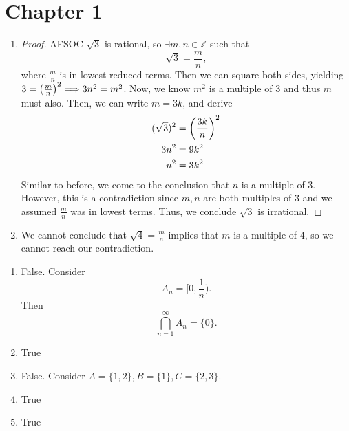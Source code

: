 \section*{Chapter 1}

\setcounter{section}{1}

\setcounter{subsection}{2}
\begin{exercise}
\begin{enumerate}[label=(\alph*)]
	\item 
	\begin{proof}
		AFSOC $\sqrt{3}$ is rational, so $\exists m, n \in \mathbb{Z}$ such that 
		\begin{equation}
			\sqrt{3} = \frac{m}{n},
		\end{equation}
		where $\frac{m}{n}$ is in lowest reduced terms.
		Then we can square both sides, yielding $3 = \left(\frac{m}{n}\right)^2 \Longrightarrow 3n^2 = m^2$. Now, we know $m^2$ is a multiple of 3 and thus $m$ must also. Then, we can write $m = 3k$, and derive
		\begin{align*}
		(\sqrt{3})^2 &= \left(\frac{3k}{n}\right)^2 \\
		3n^2 &= 9k^2 \\
		n^2 &= 3k^2
		\end{align*}
		Similar to before, we come to the conclusion that $n$ is a multiple of 3. However, this is a contradiction since $m, n$ are both multiples of 3 and we assumed $\frac{m}{n}$ was in lowest terms. Thus, we conclude $\sqrt{3}$ is irrational.
	\end{proof}
	\item We cannot conclude that $\sqrt{4} = \frac{m}{n}$ implies that $m$ is a multiple of $4$, so we cannot reach our contradiction.
\end{enumerate}
\end{exercise}

\begin{exercise}
	\begin{enumerate}[label=(\alph*)]
		\item False. Consider 
		\begin{equation}
			A_n = [0, \frac{1}{n}).
		\end{equation}
		Then 
		\begin{equation}
			\bigcap_{n=1}^\infty A_n = \{0\}.
		\end{equation}
		\item True
		\item False. Consider $A = \{1, 2\}, B = \{1\}, C = \{2, 3\}$.
		\item True
		\item True
	\end{enumerate}
\end{exercise}

